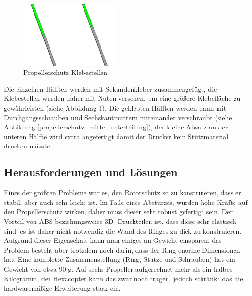 			\begin{figure}[H]
			\begin{centering}
			\includegraphics[width = 0.45\textwidth]{Bilder/propellerschutz_klebestellen}
			\par\end{centering}
			\caption{Propellerschutz Klebestellen}
			\label{propellerschutz_klebestellen}
			\end{figure}

	Die einzelnen Hälften  werden mit Sekundenkleber zusammengefügt, die Klebestellen wurden daher mit Nuten versehen,
	um eine größere Klebefläche zu gewährleisten (siehe Abbildung \ref{propellerschutz_klebestellen}).
	Die geklebten Hälften werden dann mit Durchgangsschrauben und Sechskantmuttern miteinander verschraubt (siehe Abbildung  \ref{propellerschutz_mitte_unterteilung}),
	der kleine Absatz an der unteren Hälfte wird extra angefertigt damit der Drucker kein Stützmaterial drucken müsste.

			\newpage

	\subsection{Herausforderungen und Lösungen}

	Eines der größten Probleme war es, den Rotorschutz so zu konstruieren, dass er stabil, aber auch sehr leicht ist.
	Im Falle eines Absturzes, würden hohe Kräfte auf den Propellerschutz wirken, daher muss dieser sehr robust gefertigt sein.
	Der Vorteil von ABS beziehungsweise 3D- Druckteilen ist, dass diese sehr elastisch sind, es ist daher nicht notwendig die Wand des Ringes zu dick zu konstruieren.
 	Aufgrund dieser Eigenschaft kann man einiges an Gewicht einsparen, das Problem besteht aber trotzdem noch darin, dass der Ring enorme Dimensionen hat.
	Eine komplette Zusammenstellung (Ring, Stütze und Schrauben) hat ein Gewicht von etwa 90 g.
	Auf sechs Propeller aufgerechnet mehr als ein halbes Kilogramm, der Hexacopter kann das zwar noch tragen, jedoch schränkt das die hardwaremäßige Erweiterung stark ein.

